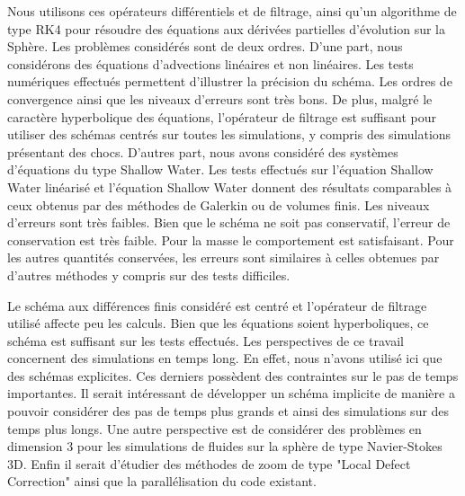Nous utilisons ces opérateurs différentiels et de filtrage, ainsi qu'un algorithme de type RK4 pour résoudre des équations aux dérivées partielles d'évolution sur la Sphère. Les problèmes considérés sont de deux ordres. D'une part, nous considérons des équations d'advections linéaires et non linéaires. Les tests numériques effectués permettent d'illustrer la précision du schéma. Les ordres de convergence ainsi que les niveaux d'erreurs sont très bons. De plus, malgré le caractère hyperbolique des équations, l'opérateur de filtrage est suffisant pour utiliser des schémas centrés sur toutes les simulations, y compris des simulations présentant des chocs.
D'autres part, nous avons considéré des systèmes d'équations du type Shallow Water. Les tests effectués sur l'équation Shallow Water linéarisé et l'équation Shallow Water donnent des résultats comparables à ceux obtenus par des méthodes de Galerkin ou de volumes finis. Les niveaux d'erreurs sont très faibles. Bien que le schéma ne soit pas conservatif, l'erreur de conservation est très faible. Pour la masse le comportement est satisfaisant. Pour les autres quantités conservées, les erreurs sont similaires à celles obtenues par d'autres méthodes y compris sur des tests difficiles.

Le schéma aux différences finis considéré est centré et l'opérateur de filtrage utilisé affecte peu les calculs. Bien que les équations soient hyperboliques, ce schéma est suffisant sur les tests effectués. Les perspectives de ce travail concernent des simulations en temps long. En effet, nous n'avons utilisé ici que des schémas explicites. Ces derniers possèdent des contraintes sur le pas de temps importantes. Il serait intéressant de développer un schéma implicite de manière a pouvoir considérer des pas de temps plus grands et ainsi des simulations sur des temps plus longs. Une autre perspective est de considérer des problèmes en dimension 3 pour les simulations de fluides sur la sphère de type Navier-Stokes 3D. Enfin il serait d'étudier des méthodes de zoom de type "Local Defect Correction" ainsi que la parallélisation du code existant.

